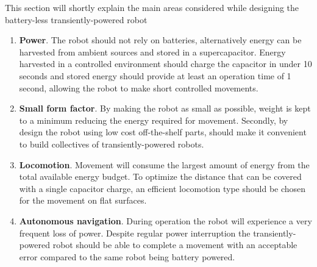 This section will shortly explain the main areas considered while designing the battery-less transiently-powered robot



\begin{enumerate}
	\item \textbf{Power}. 
	The robot should not rely on batteries, alternatively energy can be harvested from ambient sources and stored in a supercapacitor. 
	Energy harvested in a controlled environment should charge the capacitor in under 10 seconds and stored energy should provide at least an operation time of 1 second, allowing the robot to make short controlled movements.
	
	\item \textbf{Small form factor}. 
	By making the robot as small as possible, weight is kept to a minimum reducing the energy required for movement.
	Secondly, by design the robot using low cost off-the-shelf parts, should make it convenient to build collectives of transiently-powered robots.
	
	\item \textbf{Locomotion}.
	Movement will consume the largest amount of energy from the total available energy budget.
	To optimize the distance that can be covered with a single capacitor charge, an efficient locomotion type should be chosen for the movement on flat surfaces.
	
	\item \textbf{Autonomous navigation}.
	During operation the robot will experience a very frequent loss of power. 
	Despite regular power interruption the transiently-powered robot should be able to complete a movement with an acceptable error compared to the same robot being battery powered.
	
\end{enumerate}
